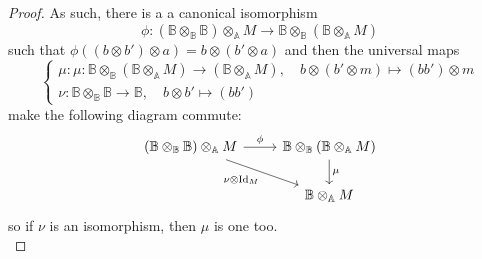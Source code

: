 \documentclass[10pt,a4paper]{amsart}
\newcommand{\bA}{\mathbb{A}}
\newcommand{\bB}{\mathbb{B}}
\begin{document}
\begin{proof}
As such, there is a a canonical isomorphism 
\[
\phi : (\bB \otimes_\bB \bB) \otimes_\bA M 
\to \bB \otimes_\bB (\bB \otimes_\bA M) 
\]
such that 
$\phi ((b \otimes b') \otimes a )
= b \otimes (b' \otimes a)$
and then the universal maps
\[
\begin{cases}
\mu : \mu : \bB \otimes_\bB (\bB \otimes_\bA M)  \to (\bB \otimes_\bA M),
\quad
b \otimes (b' \otimes m) \mapsto (bb') \otimes m
\\
\nu :
\bB \otimes_\bB \bB  \to \bB,
\quad
b \otimes b' \mapsto (bb')
\end{cases}
\]
make the following diagram commute:
\[\begin{tikzcd}
	{(\bB \otimes_\bB \bB) \otimes_\bA M} & {\bB \otimes_\bB (\bB \otimes_\bA M)} \\
	& {\bB \otimes_\bA M}
	\arrow["\phi", from=1-1, to=1-2]
	\arrow["{\nu \otimes \mathrm{Id}_M}"', from=1-1, to=2-2]
	\arrow["\mu", from=1-2, to=2-2]
\end{tikzcd}\]
so if $\nu$ is an isomorphism, then $\mu$ is one too.\\
\end{proof}
\end{document}

